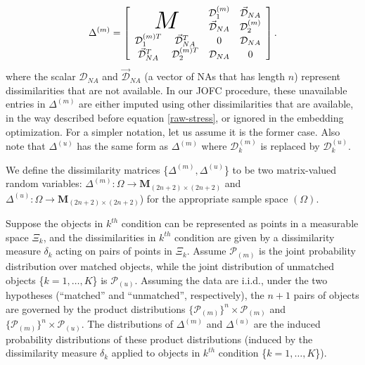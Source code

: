 \documentclass[12pt,oneside,final]{thesis}\usepackage[]{graphicx}\usepackage[]{color}
\begin{document}
 \begin{equation}
\Delta^{(m)}=  \left[ \begin{array}{cccc}
          \multicolumn{2}{c}{\multirow{2}{*}{\Huge{$M$}}} &  \mathcal{D}_1^{(m)} &\vec{\mathcal{D}}_{NA}\\
        & &  \vec{\mathcal{D}}_{NA}   & \mathcal{D}_2^{(m)} \\
  			\mathcal{D}_1^{(m)T} & \vec{\mathcal{D}}_{NA}^T  &  0 & \mathcal{D}_{NA} \\
         \vec{\mathcal{D}}_{NA}^T & \mathcal{D}_2^{(m)T} & \mathcal{D}_{NA} &0\\
     \end{array}  \right].     \label{aug_omnibus} 
\end{equation}  where
the scalar $\mathcal{D}_{NA}$ and    $\vec{\mathcal{D}}_{NA}$ (a vector of NAs that has length $n$)   represent dissimilarities that are not available. 
In our JOFC procedure, these unavailable entries in $\Delta^{(m)}$ are either imputed using other dissimilarities that are available, in the way described before equation \eqref{raw-stress}, or ignored in the embedding optimization. For a simpler  notation, let us assume it is the former case. Also note that $\Delta^{(u)}$  has the same form as $\Delta^{(m)}$ where $\mathcal{D}_k^{(m)}$ is replaced by $\mathcal{D}_k^{(u)}$.

We define the dissimilarity matrices \{$\Delta^{(m)},\Delta^{(u)}$\} to be  two matrix-valued random variables: $\Delta^{(m)}:\Omega \rightarrow \mathbf{M}_{(2n+2)\times (2n+2)} $ and  $\Delta^{(u)}:\Omega \rightarrow \mathbf{M}_{(2n+2)\times (2n+2)} $) for the appropriate sample  space $(\Omega)$.
\begin{remark}
Suppose the objects in $k^{th}$  condition  can be represented as points in a measurable space $\Xi_k$, and the dissimilarities in $k^{th}$ condition are given by  a dissimilarity measure $\delta_k$ acting on pairs of points in $\Xi_k$. Assume $\mathcal{P}_{(m)}$ is the joint probability distribution over matched objects, while the joint distribution of unmatched objects \{$k=1,\ldots,K$\}  is $\mathcal{P}_{(u)}$. Assuming the data are i.i.d., under the two hypotheses (``matched'' and ``unmatched'', respectively), the $n+1$ pairs of objects are governed  by the product distributions $\{\mathcal{P}_{(m)}\}^n \times \mathcal{P}_{(m)} $ and $\{\mathcal{P}_{(m)}\}^n \times \mathcal{P}_{(u)} $.  The distributions of $\Delta^{(m)}$ and $\Delta^{(u)}$ are the induced probability distributions of  these product distributions (induced by the  dissimilarity measure $\delta_k$ applied to  objects in $k^{th}$ condition \{$k=1,\ldots,K$\}).
\end{remark}
\end{document}
